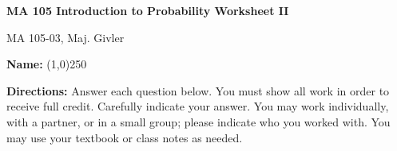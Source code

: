 \documentclass[addpoints]{exam}
\begin{document}
\begin{center}\textbf{MA 105 Introduction to Probability Worksheet II}\end{center}

\begin{bf}
MA 105-03, Maj. Givler
\end{bf}

\vspace{.5 cm}

\noindent
{\bfseries Name:} \line(1,0){250}

\noindent
{\bfseries Directions:} Answer each question below. You must show all work in order to receive full credit. Carefully indicate your answer. You may work individually, with a partner, or in a small group; please indicate who you worked with. You may use your textbook or class notes as needed.
\end{document}
